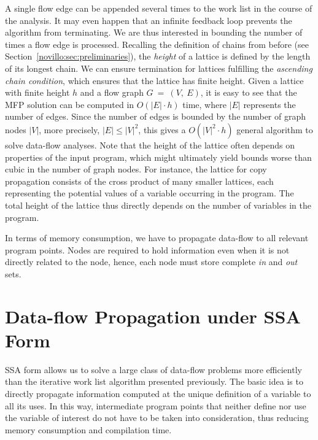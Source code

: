 A single flow edge can be appended several times to the work list in the course of the analysis. 
It may even happen that an infinite feedback loop prevents the algorithm from terminating. 
We are thus interested in bounding the number of times a flow edge is processed. 
Recalling the definition of chains from before (see Section~\ref{novillo:sec:preliminaries}), the \emph{height} of a lattice is defined by the length of its longest chain. 
We can ensure termination for lattices fulfilling the \emph{ascending chain condition}, which ensures that the lattice has finite height. 
Given a lattice with finite height $h$ and a flow graph $G~=~(V,~E)$, it is easy to see that the MFP solution can be computed in $O(|E| \cdot h)$ time, where $|E|$ represents the number of edges. 
Since the number of edges is bounded by the number of graph nodes $|V|$, more precisely, $|E| \leq |V|^2$, this gives a $O(|V|^2 \cdot h)$ general algorithm to solve data-flow analyses. 
Note that the height of the lattice often depends on properties of the input program, which might ultimately yield bounds worse than cubic in the number of graph nodes. 
For instance, the lattice for copy propagation consists of the cross product of many smaller lattices, each representing the potential values of a variable occurring in the program. 
The total height of the lattice thus directly depends on the number of variables in the program.

In terms of memory consumption, we have to propagate data-flow to all relevant program points. 
Nodes are required to hold information even when it is not directly related to the node, hence, each node must store complete \emph{in} and \emph{out} sets.


\section{Data-flow Propagation under SSA Form}
\label{cpeasier:sec:prop-engine}
SSA form allows us to solve a large class of data-flow problems more efficiently than the iterative work list algorithm presented previously. 
The basic idea is to directly propagate information computed at the unique definition of a variable to all its uses. 
In this way, intermediate program points that neither define nor use the variable of interest do not have to be taken into consideration, thus reducing memory consumption and compilation time.

